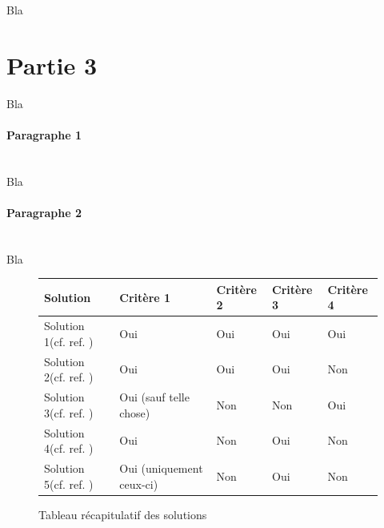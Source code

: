 Bla

\newpage

\section{Partie 3}
Bla

\paragraph*{Paragraphe 1}
~\\
\hskip7mm
Bla
\paragraph*{Paragraphe 2}
~\\
\hskip7mm
Bla

\begin{figure}[!h]
    \begin{center}
    \begin{tabular}{|l|l|l|l|l|}
      \hline
      Solution & Critère 1 & Critère 2 & Critère 3 & Critère 4\\
      \hline
      Solution 1(cf. ref. \cite{cite0}) & Oui & Oui & Oui & Oui \\
      Solution 2(cf. ref. \cite{cite1}) & Oui & Oui & Oui & Non \\
      Solution 3(cf. ref. \cite{cite2}) & Oui (sauf telle chose) & Non & Non & Oui\\
      Solution 4(cf. ref. \cite{cite3}) & Oui& Non & Oui & Non\\
      Solution 5(cf. ref. \cite{cite4}) & Oui (uniquement ceux-ci) & Non & Oui & Non\\
      \hline
    \end{tabular}
    \end{center}
    \caption{Tableau récapitulatif des solutions}
\end{figure}


